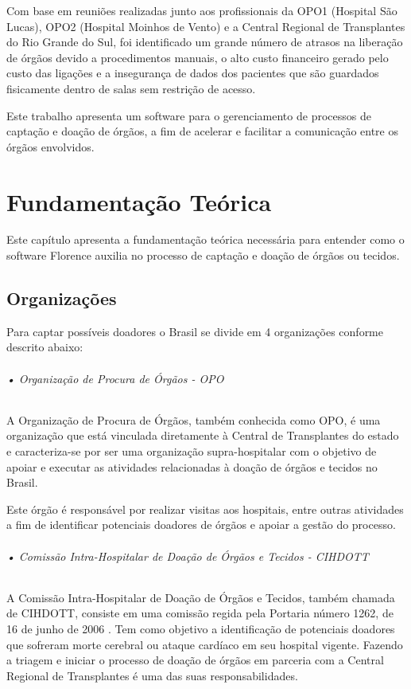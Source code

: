 \documentclass[portuguese,oneside]{tcc}
\begin{document}
Com base em reuniões realizadas junto aos profissionais da OPO1 (Hospital São Lucas), OPO2 (Hospital Moinhos de Vento) e a Central Regional de Transplantes do Rio Grande do Sul, foi identificado um grande número de atrasos na liberação de órgãos devido a procedimentos manuais, o alto custo financeiro gerado pelo custo das ligações e a insegurança de dados dos pacientes que são guardados fisicamente dentro de salas sem restrição de acesso.

Este trabalho apresenta um software para o gerenciamento de processos de captação e doação de órgãos, a fim de acelerar e facilitar a comunicação entre os órgãos envolvidos.

\chapter{Fundamentação Teórica}
Este capítulo apresenta a fundamentação teórica necessária para entender como o software Florence auxilia no processo de captação e doação de órgãos ou tecidos.

\section{Organizações}
Para captar possíveis doadores o Brasil se divide em 4 organizações conforme descrito abaixo:

\subparagraph{• Organização de Procura de Órgãos - OPO}
A Organização de Procura de Órgãos, também conhecida como OPO, é uma organização que está vinculada diretamente à Central de Transplantes do estado e caracteriza-se por ser uma organização supra-hospitalar com o objetivo de apoiar e executar as atividades relacionadas à doação de órgãos e tecidos no Brasil.

Este órgão é responsável por realizar visitas aos hospitais, entre outras atividades a fim de identificar potenciais doadores de órgãos e apoiar a gestão do processo\cite{HOSPITALSAOLUCAS}.   %

\subparagraph{• Comissão Intra-Hospitalar de Doação de Órgãos e Tecidos - CIHDOTT}
A Comissão Intra-Hospitalar de Doação de Órgãos e Tecidos, também chamada de CIHDOTT, consiste em uma comissão regida pela Portaria número 1262, de 16 de junho de 2006 \cite{HCI}.
Tem como objetivo a identificação de potenciais doadores que sofreram morte cerebral ou ataque cardíaco em seu hospital vigente. Fazendo a triagem e iniciar o processo de doação de órgãos em parceria com a Central Regional de Transplantes é uma das suas responsabilidades.
\end{document}
